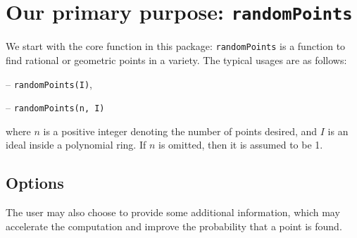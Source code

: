 \documentclass[11pt]{amsart}
\theoremstyle{definition}
\begin{document}
\section{Our primary purpose: {\tt randomPoints}}\label{randomPoints}
    We start with the core function in this package:  {\tt randomPoints} is a function to find rational or geometric points in a variety. The typical usages are as follows: 

    \vspace{0.5em}
    -- {\tt randomPoints(I)}, 

    -- {\tt randomPoints(n, I)} 

    \vspace{0.5em}
    \noindent where $n$ is a positive integer denoting the number of points desired, and 
    $I$ is an ideal inside a polynomial ring.  If {$ n$} is omitted, then it is assumed to be 1.


    \subsection{Options}\label{strategydetails}

    The user may also choose to provide some additional information, which
    may accelerate the computation and improve the probability that a point is found.
\end{document}
